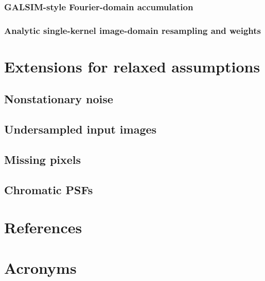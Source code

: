 \documentclass[DM,authoryear,toc]{lsstdoc}
\begin{document}
\subsubsection{GALSIM-style Fourier-domain accumulation}

\subsubsection{Analytic single-kernel image-domain resampling and weights}

\section{Extensions for relaxed assumptions}

\subsection{Nonstationary noise}

\subsection{Undersampled input images}

\subsection{Missing pixels}

\subsection{Chromatic PSFs}


\appendix
\section{References} \label{sec:bib}
\renewcommand{\refname}{} %


\section{Acronyms} \label{sec:acronyms}

\end{document}
